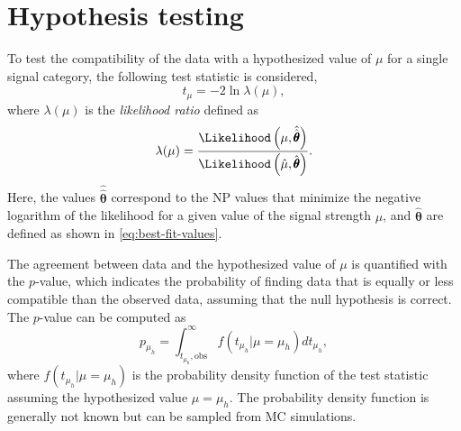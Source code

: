 \section{Hypothesis testing}
\label{sec:hypothesis-testing}
To test the compatibility of the data with a hypothesized value of $\mu$ for a single signal category, the following test statistic is considered,
\begin{equation}
    t_\mu = -2 \ln \lambda(\mu),
\end{equation}
where $\lambda(\mu)$ is the \emph{likelihood ratio} defined as
\begin{equation}
    \label{eq:likelihoodratio}
    \lambda(\mu) = \frac{ \Likelihood \left( \mu, \hat{\hat{\pmb{\theta}}} \right) } { \Likelihood \left( \hat{\mu} , \hat{\pmb{\theta}} \right) }.
\end{equation}
Here, the values $\hat{\hat{\pmb{\theta}}}$ correspond to the NP values that minimize the negative logarithm of the likelihood for a given value of the signal strength $\mu$, and $\hat{\pmb{\theta}}$ are defined as shown in \cref{eq:best-fit-values}. 

The agreement between data and the hypothesized value of $\mu$ is quantified with the $p$-value, which indicates the probability of finding data that is equally or less compatible than the observed data, assuming that the null hypothesis is correct.
The $p$-value can be computed as
\begin{equation}
    \label{eq:p-value-discovery}
    p_{\mu_h} = \int_{t_{\mu_h}, \text{obs}}^{\infty} f \left( t_{\mu_h} | \mu = \mu_h \right) dt_{\mu_h},
\end{equation}
where $f \left( t_{\mu_h} | \mu=\mu_h \right)$ is the probability density function of the test statistic assuming the hypothesized value $\mu=\mu_h$.
The probability density function is generally not known but can be sampled from MC simulations. 


